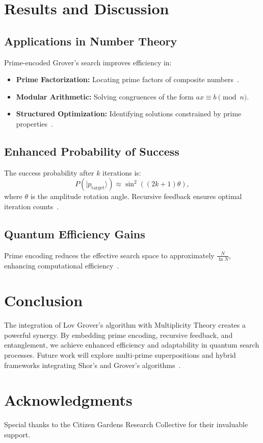 \documentclass{article}
\theoremstyle{plain}
\begin{document}
\section{Results and Discussion}

\subsection{Applications in Number Theory}
Prime-encoded Grover’s search improves efficiency in:
\begin{itemize}
    \item \textbf{Prime Factorization:} Locating prime factors of composite numbers~\cite{shor1994}.
    \item \textbf{Modular Arithmetic:} Solving congruences of the form \(ax \equiv b \pmod{n}\).
    \item \textbf{Structured Optimization:} Identifying solutions constrained by prime properties~\cite{berkowitz2021}.
\end{itemize}

\subsection{Enhanced Probability of Success}
The success probability after \(k\) iterations is:
\begin{equation}
P(|p_{\text{target}}\rangle) \approx \sin^2\left((2k+1)\theta\right),
\end{equation}
where \(\theta\) is the amplitude rotation angle. Recursive feedback ensures optimal iteration counts~\cite{ricks2004}.

\subsection{Quantum Efficiency Gains}
Prime encoding reduces the effective search space to approximately \(\frac{N}{\ln N}\), enhancing computational efficiency~\cite{hardy1916}.

\section{Conclusion}
The integration of Lov Grover's algorithm with Multiplicity Theory creates a powerful synergy. By embedding prime encoding, recursive feedback, and entanglement, we achieve enhanced efficiency and adaptability in quantum search processes. Future work will explore multi-prime superpositions and hybrid frameworks integrating Shor’s and Grover’s algorithms~\cite{shor1994}.

\section*{Acknowledgments}
Special thanks to the Citizen Gardens Research Collective for their invaluable support.



\end{document}

